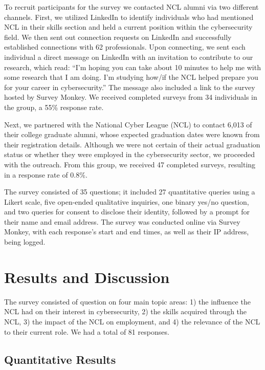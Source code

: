 \documentclass{article}
\begin{document}
To recruit participants for the survey we contacted NCL alumni via two different channels.  First, we utilized LinkedIn to identify individuals who had mentioned NCL in their skills section and held a current position within the cybersecurity field.  We then sent out connection requests on LinkedIn and successfully established connections with 62 professionals. Upon connecting, we sent each individual a direct message on LinkedIn with an invitation to contribute to our research, which read: ``I'm hoping you can take about 10 minutes to help me with some research that I am doing. I'm studying how/if the NCL helped prepare you for your career in cybersecurity.''  The message also included a link to the survey hosted by Survey Monkey. We received completed surveys from 34 individuals in the group, a 55\% response rate.

Next, we partnered with the National Cyber League (NCL) to contact 6,013 of their college graduate alumni, whose expected graduation dates were known from their registration details. Although we were not certain of their actual graduation status or whether they were employed in the cybersecurity sector, we proceeded with the outreach. From this group, we received 47 completed surveys, resulting in a response rate of 0.8\%.

The survey consisted of 35 questions; it included 27 quantitative queries using a Likert scale, five open-ended qualitative inquiries, one binary yes/no question, and two queries for consent to disclose their identity, followed by a prompt for their name and email address. The survey was conducted online via Survey Monkey, with each response's start and end times, as well as their IP address, being logged.


\section{Results and Discussion}

The survey consisted of question on four main topic areas: 1) the influence the NCL had on their interest in cybersecurity, 2) the skills acquired through the NCL, 3) the impact of the NCL on employment, and 4) the relevance of the NCL to their current role. We had a total of 81 responses.

\subsection{Quantitative Results}
\end{document}
